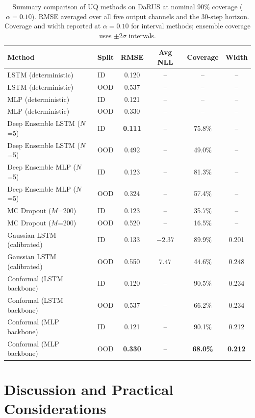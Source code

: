 \documentclass[a4paper,fleqn]{cas-sc}
\begin{document}
\begin{table}[t]
\centering
\caption{Summary comparison of UQ methods on DaRUS at nominal 90\% coverage ($\alpha=0.10$). RMSE averaged over all five output channels and the 30-step horizon. Coverage and width reported at $\alpha=0.10$ for interval methods; ensemble coverage uses $\pm2\sigma$ intervals.}
\label{tab:uq-summary}
\begin{tabular}{llcccc}
\toprule
\textbf{Method} & \textbf{Split} & \textbf{RMSE} & \textbf{Avg NLL} & \textbf{Coverage} & \textbf{Width} \\
\midrule
LSTM (deterministic) & ID  & 0.120 & -- & -- & -- \\
LSTM (deterministic) & OOD & 0.537 & -- & -- & -- \\
MLP (deterministic)  & ID  & 0.121 & -- & -- & -- \\
MLP (deterministic)  & OOD & 0.330 & -- & -- & -- \\
\midrule
Deep Ensemble LSTM ($N$=5) & ID  & \textbf{0.111} & -- & 75.8\% & -- \\
Deep Ensemble LSTM ($N$=5) & OOD & 0.492          & -- & 49.0\% & -- \\
Deep Ensemble MLP ($N$=5)  & ID  & 0.123          & -- & 81.3\% & -- \\
Deep Ensemble MLP ($N$=5)  & OOD & 0.324          & -- & 57.4\% & -- \\
\midrule
MC Dropout ($M$=200)       & ID  & 0.123 & -- & 35.7\% & -- \\
MC Dropout ($M$=200)       & OOD & 0.520 & -- & 16.5\% & -- \\
\midrule
Gaussian LSTM (calibrated) & ID  & 0.133 & $-2.37$ & 89.9\% & 0.201 \\
Gaussian LSTM (calibrated) & OOD & 0.550 & $7.47$  & 44.6\% & 0.248 \\
\midrule
Conformal (LSTM backbone)  & ID  & 0.120 & -- & 90.5\% & 0.234 \\
Conformal (LSTM backbone)  & OOD & 0.537 & -- & 66.2\% & 0.234 \\
Conformal (MLP backbone)   & ID  & 0.121 & -- & 90.1\% & 0.212 \\
Conformal (MLP backbone)   & OOD & \textbf{0.330} & -- & \textbf{68.0\%} & \textbf{0.212} \\
\bottomrule
\end{tabular}
\end{table}

\section{Discussion and Practical Considerations}
\label{sec:limitations}
\end{document}
